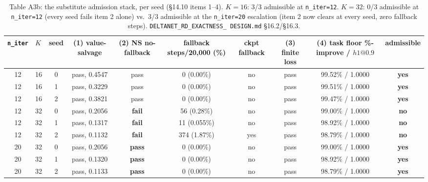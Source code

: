 \begin{table}[htbp]
\centering
\scriptsize
\begin{tabular}{clcccccccc}
\toprule
\texttt{n\_iter} & $K$ & seed & (1) value-salvage & (2) NS no-fallback & fallback steps/20{,}000 (\%) & ckpt fallback & (3) finite loss & (4) task floor \%-improve / $h1@0.9$ & admissible \\
\midrule
12 & 16 & 0 & pass, 0.4547 & pass & 0 (0.00\%)   & no  & pass & 99.52\% / 1.0000 & \textbf{yes} \\
12 & 16 & 1 & pass, 0.3229 & pass & 0 (0.00\%)   & no  & pass & 99.51\% / 1.0000 & \textbf{yes} \\
12 & 16 & 2 & pass, 0.3821 & pass & 0 (0.00\%)   & no  & pass & 99.47\% / 1.0000 & \textbf{yes} \\
12 & 32 & 0 & pass, 0.2056 & \textbf{fail} & 56 (0.28\%)  & no  & pass & 99.00\% / 1.0000 & \textbf{no} \\
12 & 32 & 1 & pass, 0.1317 & \textbf{fail} & 11 (0.055\%) & no  & pass & 98.92\% / 1.0000 & \textbf{no} \\
12 & 32 & 2 & pass, 0.1132 & \textbf{fail} & 374 (1.87\%) & yes & pass & 98.79\% / 1.0000 & \textbf{no} \\
20 & 32 & 0 & pass, 0.2056 & \textbf{pass} & 0 (0.00\%)   & no  & pass & 99.00\% / 1.0000 & \textbf{yes} \\
20 & 32 & 1 & pass, 0.1320 & \textbf{pass} & 0 (0.00\%)   & no  & pass & 98.92\% / 1.0000 & \textbf{yes} \\
20 & 32 & 2 & pass, 0.1133 & \textbf{pass} & 0 (0.00\%)   & no  & pass & 98.79\% / 1.0000 & \textbf{yes} \\
\bottomrule
\end{tabular}
\caption{Table A3b: the substitute admission stack, per seed (\S14.10
items 1--4). $K{=}16$: 3/3 admissible at \texttt{n\_iter=12}. $K{=}32$:
0/3 admissible at \texttt{n\_iter=12} (every seed fails item 2 alone) vs.\
3/3 admissible at the \texttt{n\_iter=20} escalation (item 2 now clears
at every seed, zero fallback steps). \texttt{DELTANET\_RD\_EXACTNESS\_
DESIGN.md} \S16.2/\S16.3.}
\end{table}

